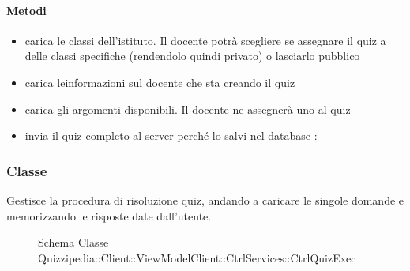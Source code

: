 \paragraph{Metodi}
\begin{itemize}
\item {}
\newline
carica le classi dell'istituto. Il docente potrà scegliere se assegnare il quiz a delle classi specifiche (rendendolo quindi privato) o lasciarlo pubblico
\newline
\item {}
\newline
carica leinformazioni sul docente che sta creando il quiz
\newline
\item {}
\newline
carica gli argomenti disponibili. Il docente ne assegnerà uno al quiz
\newline
\item {}
\newline
invia il quiz completo al server perché lo salvi nel database
\newline
{} :
\end{itemize}
\subsubsection{Classe }
Gestisce la procedura di risoluzione quiz, andando a caricare le singole domande e memorizzando le risposte date dall'utente.
\begin{figure}[H]
\centering
\noindent{}
\caption[Schema Classe CtrlQuizExec]{Schema Classe Quizzipedia::Client::ViewModelClient::CtrlServices::CtrlQuizExec}
\end{figure}
